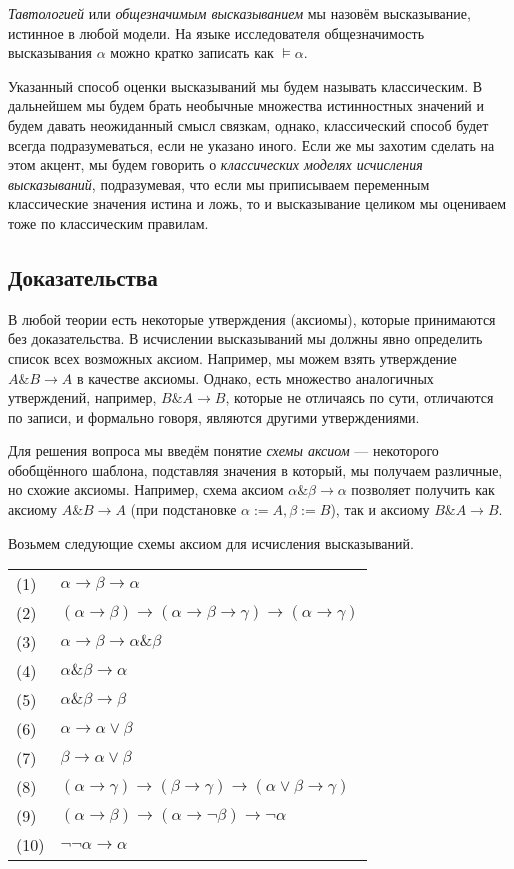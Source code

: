 \emph{Тавтологией} или 
\emph{общезначимым высказыванием} мы назовём высказывание, истинное в любой модели.
На языке исследователя общезначимость высказывания $\alpha$ можно кратко 
записать как $\models \alpha$. 

Указанный способ оценки высказываний мы будем называть классическим.
В дальнейшем мы будем брать необычные множества истинностных значений и будем давать
неожиданный смысл связкам, однако, классический способ будет всегда подразумеваться, 
если не указано иного. Если же мы захотим сделать на этом акцент, мы будем говорить
о \emph{классических моделях исчисления высказываний}, подразумевая, что
если мы приписываем переменным классические значения истина и ложь, 
то и высказывание целиком мы оцениваем тоже по классическим правилам.

\subsection{Доказательства}

В любой теории есть некоторые утверждения (аксиомы), которые принимаются без доказательства.
В исчислении высказываний мы должны явно определить список всех возможных аксиом. 
Например, мы можем взять утверждение $A \& B \rightarrow A$ в качестве аксиомы.
Однако, есть множество аналогичных утверждений, например, $B \& A \rightarrow B$,
которые не отличаясь по сути, отличаются по записи, и формально говоря, являются другими
утверждениями.

Для решения вопроса мы введём понятие \emph{схемы аксиом} --- некоторого обобщённого
шаблона, подставляя значения в который, мы получаем различные, но схожие аксиомы. 
Например, схема аксиом $\alpha \& \beta \rightarrow \alpha$ позволяет получить как
аксиому $A \& B \rightarrow A$ (при подстановке $\alpha := A, \beta := B$), так и
аксиому $B \& A \rightarrow B$.

Возьмем следующие схемы аксиом для исчисления высказываний.

\begin{tabular}{ll}
(1) & $\alpha \rightarrow \beta \rightarrow \alpha$ \\
(2) & $(\alpha \rightarrow \beta) \rightarrow (\alpha \rightarrow \beta \rightarrow \gamma) \rightarrow (\alpha \rightarrow \gamma)$ \\
(3) & $\alpha \rightarrow \beta \rightarrow \alpha \& \beta$\\
(4) & $\alpha \& \beta \rightarrow \alpha$\\
(5) & $\alpha \& \beta \rightarrow \beta$\\
(6) & $\alpha \rightarrow \alpha \vee \beta$\\
(7) & $\beta \rightarrow \alpha \vee \beta$\\
(8) & $(\alpha \rightarrow \gamma) \rightarrow (\beta \rightarrow \gamma) \rightarrow (\alpha \vee \beta \rightarrow \gamma)$\\
(9) & $(\alpha \rightarrow \beta) \rightarrow (\alpha \rightarrow \neg \beta) \rightarrow \neg \alpha$\\
(10) & $\neg \neg \alpha \rightarrow \alpha$
\end{tabular}


